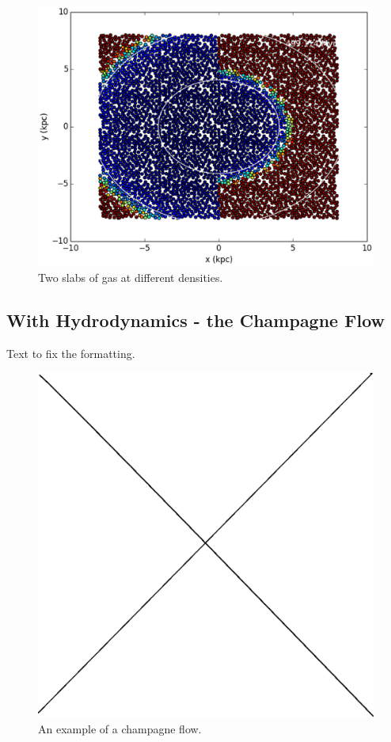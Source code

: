 \begin{figure}
\includegraphics[width=\textwidth]{graphics/gasWall01000HIslice.eps}
\caption[Two slabs of gas at different densities.]{Two slabs of gas at different densities.}
\label{fig:gaswall}
\end{figure}


\subsection{With Hydrodynamics - the Champagne Flow}
\label{sec:champagne}

Text to fix the formatting.

\begin{figure}
\includegraphics[width=\textwidth]{graphics/placeholder.eps}
\caption[An example of a champagne flow.]{An example of a champagne flow.}
\label{fig:champagne}
\end{figure}

